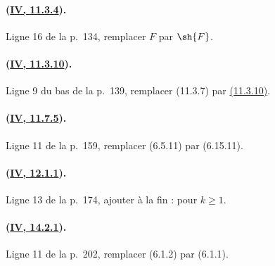 \paragraph{({\texorpdfstring{\protect\hyperref[canon-index.ega4.c04.prop.11-3-4]{IV, 11.3.4}}{IV, 11.3.4}}).}
Ligne 16 de la p.~134, remplacer $F$ par $\sh{F}$.

\paragraph{({\texorpdfstring{\protect\hyperref[canon-index.ega4.c04.thm.11-3-10]{IV, 11.3.10}}{IV, 11.3.10}}).}
Ligne 9 du bas de la p.~139, remplacer (11.3.7) par
{\hyperref[canon-index.ega4.c04.thm.11-3-10]{(11.3.10)}}.

\paragraph{({\texorpdfstring{\protect\hyperref[canon-index.ega4.c04.statement.11-7-5]{IV, 11.7.5}}{IV, 11.7.5}}).}
Ligne 11 de la p.~159, remplacer (6.5.11) par (6.15.11).

\paragraph{({\texorpdfstring{\protect\hyperref[canon-index.ega4.c04.thm.12-1-1]{IV, 12.1.1}}{IV, 12.1.1}}).}
Ligne 13 de la p.~174, ajouter à la fin : pour $k\geq1$.

\paragraph{({\texorpdfstring{\protect\hyperref[canon-index.ega4.c04.thm.14-2-1]{IV, 14.2.1}}{IV, 14.2.1}}).}
Ligne 11 de la p.~202, remplacer (6.1.2) par (6.1.1).


